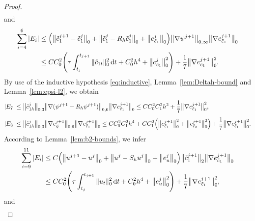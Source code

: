 \begin{proof}
\begin{align}
  \label{eq:E123}
\end{align}
and
\begin{align}
  \sum_{i=4}^{6}|E_{i}|
  &\leq \Bigl(\bigl\|\tilde{c}_{1}^{j+1}-\tilde{c}_{1}^{j}\bigr\|_{0}
             + \bigl\|\tilde{c}_{1}^{j} - R_{h}\tilde{c}_{1}^{j}\bigr\|_{0}
             + \bigl\|e_{\tilde{c}_{1}}^{j}\bigr\|_{0}\Bigr)
    \bigl\|\nabla\psi^{j+1}\bigr\|_{0,\infty}
    \bigl\|\nabla e_{\tilde{c}_{1}}^{j+1}\bigr\|_{0}
  \nonumber\\
  &\leq CC_{0}^{2}\!\left(\tau\int_{t_{j}}^{t_{j+1}}\|\tilde{c}_{1t}\|_{0}^{2}\,\mathrm{d}t
    + C_{0}^{2}h^{4}
    + \bigl\|e_{\tilde{c}_{1}}^{j}\bigr\|_{0}^{2}\right)
   + \frac{1}{7}\bigl\|\nabla e_{\tilde{c}_{1}}^{j+1}\bigr\|_{0}^{2}.
  \label{eq:E456}
\end{align}
By use of the inductive hypothesis \eqref{eq:inductive}, Lemma~\ref{lem:Deltah-bound} and
Lemma~\ref{lem:epsi-l2}, we obtain
\begin{align}
  |E_{7}|
  &\leq \bigl\|\tilde{c}_{1h}^{j}\bigr\|_{0,3}
         \bigl\|\nabla(\psi^{j+1} - R_{h}\psi^{j+1})\bigr\|_{0,6}
         \bigl\|\nabla e_{\tilde{c}_{1}}^{j+1}\bigr\|_{0}
  \leq CC_{0}^{2}C_{1}^{2}h^{2}
       + \frac{1}{7}\bigl\|\nabla e_{\tilde{c}_{1}}^{j+1}\bigr\|_{0}^{2},
  \label{eq:E7}\\[4pt]
  |E_{8}|
  &\leq \bigl\|\tilde{c}_{1h}^{j}\bigr\|_{0,3}
         \bigl\|\nabla e_{\psi}^{j+1}\bigr\|_{0,6}
         \bigl\|\nabla e_{\tilde{c}_{1}}^{j+1}\bigr\|_{0}
  \leq CC_{0}^{2}C_{1}^{2}h^{4}
       + CC_{1}^{2}\Bigl(\bigl\|e_{\tilde{c}_{1}}^{j+1}\bigr\|_{0}^{2}
                         + \bigl\|e_{\tilde{c}_{2}}^{j+1}\bigr\|_{0}^{2}\Bigr)
       + \frac{1}{7}\bigl\|\nabla e_{\tilde{c}_{1}}^{j+1}\bigr\|_{0}^{2}.
  \label{eq:E8}
\end{align}
According to Lemma~\ref{lem:b2-bounds}, we infer
\begin{align}
  \sum_{i=9}^{11}|E_{i}|
  &\leq C\Bigl(\bigl\|u^{j+1}-u^{j}\bigr\|_{0}
              + \bigl\|u^{j} - S_{h}u^{j}\bigr\|_{0}
              + \bigl\|e_{u}^{j}\bigr\|_{0}\Bigr)
    \bigl\|\tilde{c}_{1}^{j+1}\bigr\|_{2}
    \bigl\|\nabla e_{\tilde{c}_{1}}^{j+1}\bigr\|_{0}
  \nonumber\\
  &\leq CC_{0}^{2}\!\left(\tau\int_{t_{j}}^{t_{j+1}}\|u_{t}\|_{0}^{2}\,\mathrm{d}t
    + C_{0}^{2}h^{4}
    + \bigl\|e_{u}^{j}\bigr\|_{0}^{2}\right)
   + \frac{1}{7}\bigl\|\nabla e_{\tilde{c}_{1}}^{j+1}\bigr\|_{0}^{2},
  \label{eq:E9-11}
\end{align}
and
\begin{align}

\end{align}
\end{proof}
